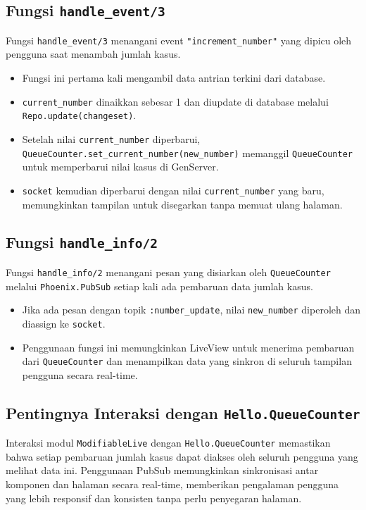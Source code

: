 \subsection{Fungsi \texttt{handle\_event/3}}
Fungsi \texttt{handle\_event/3} menangani event \texttt{"increment\_number"} yang dipicu oleh pengguna saat menambah jumlah kasus.
\begin{itemize}
	\item Fungsi ini pertama kali mengambil data antrian terkini dari database.
	\item \texttt{current\_number} dinaikkan sebesar 1 dan diupdate di database melalui \texttt{Repo.update(changeset)}.
	\item Setelah nilai \texttt{current\_number} diperbarui, \texttt{QueueCounter.set\_current\_number(new\_number)} memanggil \texttt{QueueCounter} untuk memperbarui nilai kasus di GenServer.
	\item \texttt{socket} kemudian diperbarui dengan nilai \texttt{current\_number} yang baru, memungkinkan tampilan untuk disegarkan tanpa memuat ulang halaman.
\end{itemize}

\subsection{Fungsi \texttt{handle\_info/2}}
Fungsi \texttt{handle\_info/2} menangani pesan yang disiarkan oleh \texttt{QueueCounter} melalui \texttt{Phoenix.PubSub} setiap kali ada pembaruan data jumlah kasus.
\begin{itemize}
	\item Jika ada pesan dengan topik \texttt{:number\_update}, nilai \texttt{new\_number} diperoleh dan diassign ke \texttt{socket}.
	\item Penggunaan fungsi ini memungkinkan LiveView untuk menerima pembaruan dari \texttt{QueueCounter} dan menampilkan data yang sinkron di seluruh tampilan pengguna secara real-time.
\end{itemize}

\subsection{Pentingnya Interaksi dengan \texttt{Hello.QueueCounter}}
Interaksi modul \texttt{ModifiableLive} dengan \texttt{Hello.QueueCounter} memastikan bahwa setiap pembaruan jumlah kasus dapat diakses oleh seluruh pengguna yang melihat data ini. Penggunaan PubSub memungkinkan sinkronisasi antar komponen dan halaman secara real-time, memberikan pengalaman pengguna yang lebih responsif dan konsisten tanpa perlu penyegaran halaman.

